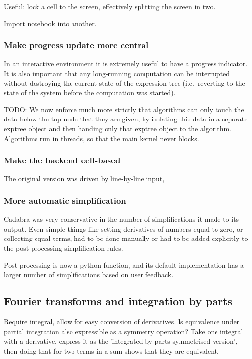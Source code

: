 \documentclass[11pt]{article}
\begin{document}
Useful: lock a cell to the screen, effectively splitting the screen in
two. 

Import notebook into another. 

\subsubsection{Make progress update more central}

In an interactive environment it is extremely useful to have a
progress indicator. It is also important that any long-running
computation can be interrupted without destroying the current state of
the expression tree (i.e.~reverting to the state of the system before
the computation was started). 

TODO: We now enforce much more strictly that algorithms can only touch the
data below the top node that they are given, by isolating this data in
a separate exptree object and then handing only that exptree object to
the algorithm. Algorithms run in threads, so that the main kernel
never blocks.

\subsubsection{Make the backend cell-based}

The original version was driven by line-by-line input, 

\subsubsection{More automatic simplification}

Cadabra was very conservative in the number of simplifications it made
to its output. Even simple things like setting derivatives of
numbers equal to zero, or collecting equal terms, had to be done
manually or had to be added explicitly to the post-processing
simplification rules.

Post-processing is now a python function, and its default
implementation has a larger number of simplifications based on user
feedback. 


\subsection{Fourier transforms and integration by parts}

Require integral, allow for easy conversion of derivatives. Is
equivalence under partial integration also expressible as a symmetry
operation? Take one integral with a derivative, express it as the
'integrated by parts symmetrised version', then doing that for two
terms in a sum shows that they are equivalent.
\end{document}
